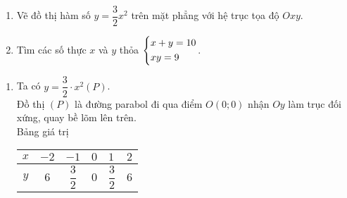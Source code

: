 \begin{ex}%
    \begin{enumerate}    
        \item Vẽ đồ thị hàm số $y= \dfrac{3}{2} x^2$ trên mặt phẳng với hệ trục tọa độ $Oxy$.
        \item Tìm các số thực $x$ và $y$ thỏa $\left\{\begin{aligned}&x+y=10\\&xy=9\end{aligned}\right.$.
    \end{enumerate}
\loigiai
    {
    \begin{enumerate}
        \item Ta có $y= \dfrac{3}{2} \cdot x^2 (P)$.\\
        Đồ thị $(P)$ là đường parabol đi qua điểm $O(0;0)$ nhận $Oy$ làm trục đối xứng, quay bề lõm lên trên.\\
        Bảng giá trị
 		
		\begin{tabular}{c|c|c|p{0.5 cm}|p{0.5 cm}|p{0.4 cm}}
			$x$ & $-2$ & $-1$ & $0$ & $1$ & $2$ \\ \hline
			$y$ & $6$ & $\dfrac{3}{2}$ & $0$ & $\dfrac{3}{2}$ & $6$
		\end{tabular}
	

\end{enumerate}}
\end{ex}
